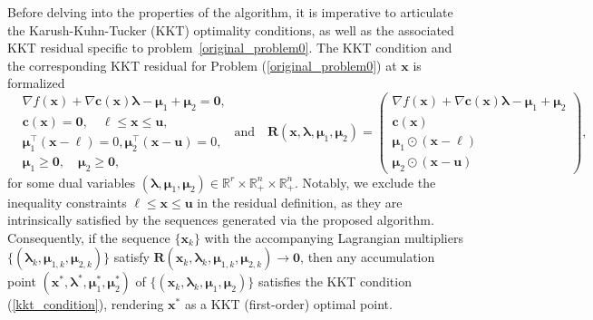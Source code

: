 \documentclass[aos]{imsart}
\numberwithin{equation}{section}
\theoremstyle{plain}
\begin{document}
Before delving into the properties of the algorithm, it is imperative to articulate the Karush-Kuhn-Tucker (KKT) optimality conditions, as well as the associated KKT residual specific to problem~\eqref{original_problem0}. 
    The KKT condition and  the corresponding KKT residual for Problem (\ref{original_problem0}) at $\bm{x}$ is formalized
    \begin{equation}
    \label{kkt_condition}
        \begin{split}
            & \nabla f (\bm{x}) + \nabla \bm{c}(\bm{x}) \bm{\lambda} - \bm{\mu}_1 + \bm{\mu}_2 = \bm{0},\\
            & \bm{c}(\bm{x}) = \bm{0},\quad \bm{\ell} \leq \bm{x} \leq \bm{u},\\
            & \bm{\mu}_1^{\top} (\bm{x} - \bm{\ell}) = 0,  \bm{\mu}_2^{\top} (\bm{x} - \bm{u}) = 0,\\
            & \bm{\mu}_1 \geq \bm{0}, \quad \bm{\mu}_2 \geq \bm{0},
        \end{split} ~\text{and} \quad
        \bm{R}(\bm{x},\bm{\lambda},\bm{\mu}_1,\bm{\mu}_2) = \left ( \begin{array}{c}
             \nabla f (\bm{x}) + \nabla \bm{c}(\bm{x}) \bm{\lambda} - \bm{\mu}_1 + \bm{\mu}_2  \\
            \bm{c}(\bm{x}) \\
            \bm{\mu}_1 \odot (\bm{x} - \bm{\ell})\\
            \bm{\mu}_2 \odot (\bm{x} - \bm{u})
        \end{array}\right),
    \end{equation}
    for some dual variables $(\bm{\lambda}, \bm{\mu}_1, \bm{\mu}_2) \in \mathbb{R}^{r} \times \mathbb{R}^{n}_{+} \times \mathbb{R}^{n}_{+}$. Notably, we exclude the inequality constraints $\bm{\ell} \leq \bm{x} \leq \bm{u}$ in the residual definition, as they are intrinsically satisfied by the sequences generated via the proposed algorithm.
    Consequently, if the sequence $\{\bm{x}_k\}$ with the accompanying Lagrangian multipliers $\{(\bm{\lambda}_k, \bm{\mu}_{1,k}, \bm{\mu}_{2,k})\}$ satisfy $\bm{R}(\bm{x}_k, \bm{\lambda}_k, \bm{\mu}_{1,k}, \bm{\mu}_{2,k}) \to \bm{0}$, then any accumulation point $(\bm{x}^{*},\bm{\lambda}^{*},\bm{\mu}_1^{*},\bm{\mu}_2^{*})$ of $\{(\bm{x}_k,\bm{\lambda}_k, \bm{\mu}_1, \bm{\mu}_2)\}$ satisfies the KKT condition (\ref{kkt_condition}), rendering $\bm{x}^{*}$ as a KKT (first-order) optimal point.
\end{document}
